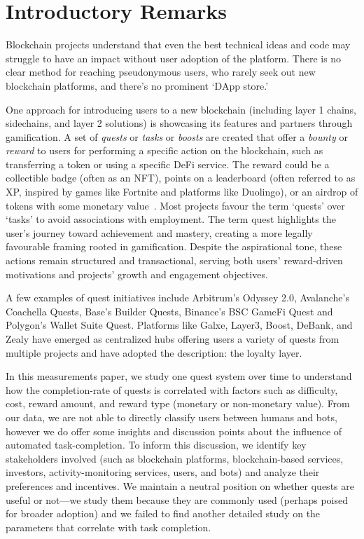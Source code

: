 
\section{Introductory Remarks}

Blockchain projects understand that even the best technical ideas and code may struggle to have an impact without user adoption of the platform. There is no clear method for reaching pseudonymous users, who rarely seek out new blockchain platforms, and there’s no prominent `DApp store.' 

One approach for introducing users to a new blockchain (including layer 1 chains, sidechains, and layer 2 solutions) is showcasing its features and partners through gamification. A set of \textit{quests} or \textit{tasks} or \textit{boosts} are created that offer a \textit{bounty} or \textit{reward} to users for performing a specific action on the blockchain, such as transferring a token or using a specific DeFi service. The reward could be a collectible badge (often as an NFT), points on a leaderboard (often referred to as XP, inspired by games like Fortnite and platforms like Duolingo), or an airdrop of tokens with some monetary value~\cite{FB19,MYL24,YL24}. Most projects favour the term `quests' over `tasks' to avoid associations with employment. The term quest highlights the user's journey toward achievement and mastery, creating a more legally favourable framing rooted in gamification. Despite the aspirational tone, these actions remain structured and transactional, serving both users’ reward-driven motivations and projects’ growth and engagement objectives.

A few examples of quest initiatives include Arbitrum's Odyssey 2.0, Avalanche's Coachella Quests, Base's Builder Quests, Binance's BSC GameFi Quest and Polygon's Wallet Suite Quest. Platforms like Galxe, Layer3, Boost, DeBank, and Zealy have emerged as centralized hubs offering users a variety of quests from multiple projects and have adopted the description: the loyalty layer. 

In this measurements paper, we study one quest system over time to understand how the completion-rate of quests is correlated with factors such as difficulty, cost, reward amount, and reward type (monetary or non-monetary value). From our data, we are not able to directly classify users between humans and bots, however we do offer some insights and discussion points about the influence of automated task-completion. To inform this discussion, we identify key stakeholders involved (such as blockchain platforms, blockchain-based services, investors, activity-monitoring services, users, and bots) and analyze their preferences and incentives. We maintain a neutral position on whether quests are useful or not---we study them because they are commonly used (perhaps poised for broader adoption) and we failed to find another detailed study on the parameters that correlate with task completion. 

